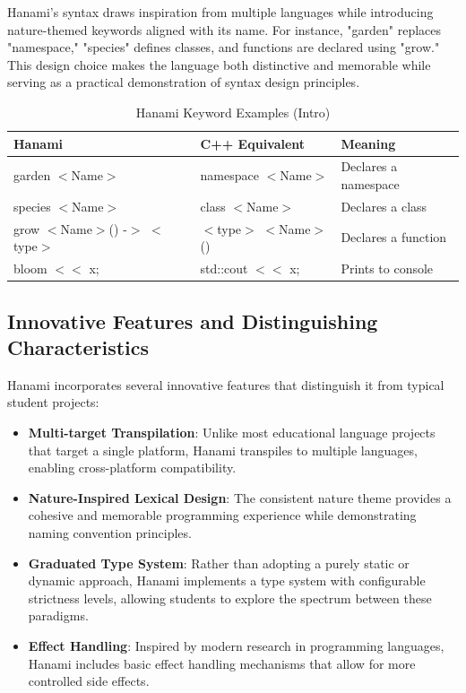\documentclass[conference]{IEEEtran}
\begin{document}
Hanami's syntax draws inspiration from multiple languages while introducing nature-themed keywords aligned with its name. For instance, "garden" replaces "namespace," "species" defines classes, and functions are declared using "grow." This design choice makes the language both distinctive and memorable while serving as a practical demonstration of syntax design principles.

\begin{table}[tbp] %
    \caption{Hanami Keyword Examples (Intro)}
    \label{table:keywords_intro}
    \centering
    \begin{tabular}{|l|l|l|}
        \hline
        \textbf{Hanami} & \textbf{C++ Equivalent} & \textbf{Meaning} \\
        \hline
        garden $<$Name$>$ & namespace $<$Name$>$ & Declares a namespace \\
        \hline
        species $<$Name$>$ & class $<$Name$>$ & Declares a class \\
        \hline
        grow $<$Name$>$() -$>$ $<$type$>$ & $<$type$>$ $<$Name$>$() & Declares a function \\
        \hline
        bloom $<<$ x; & std::cout $<<$ x; & Prints to console \\
        \hline
    \end{tabular}
\end{table}

\subsection{Innovative Features and Distinguishing Characteristics}

Hanami incorporates several innovative features that distinguish it from typical student projects:

\begin{itemize}
    \item \textbf{Multi-target Transpilation}: Unlike most educational language projects that target a single platform, Hanami transpiles to multiple languages, enabling cross-platform compatibility.
    \item \textbf{Nature-Inspired Lexical Design}: The consistent nature theme provides a cohesive and memorable programming experience while demonstrating naming convention principles.
    \item \textbf{Graduated Type System}: Rather than adopting a purely static or dynamic approach, Hanami implements a type system with configurable strictness levels, allowing students to explore the spectrum between these paradigms.
    \item \textbf{Effect Handling}: Inspired by modern research in programming languages, Hanami includes basic effect handling mechanisms that allow for more controlled side effects.
\end{itemize}
\end{document}
